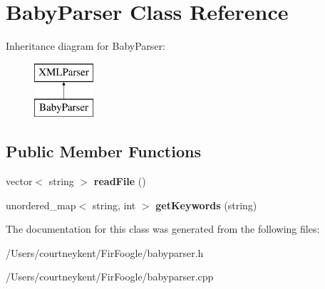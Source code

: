 \hypertarget{class_baby_parser}{\section{Baby\+Parser Class Reference}
\label{class_baby_parser}
}
Inheritance diagram for Baby\+Parser\+:\begin{figure}[H]
\begin{center}
\leavevmode
\includegraphics[height=2.000000cm]{class_baby_parser}
\end{center}
\end{figure}
\subsection*{Public Member Functions}
\begin{DoxyCompactItemize}
\item 
\hypertarget{class_baby_parser_a1d655cf5ea541ff3e5ef39652d48f245}{vector$<$ string $>$ {\bfseries read\+File} ()}\label{class_baby_parser_a1d655cf5ea541ff3e5ef39652d48f245}

\item 
\hypertarget{class_baby_parser_a67c3fa2b462cf7c727ebfa41fb70b764}{unordered\+\_\+map$<$ string, int $>$ {\bfseries get\+Keywords} (string)}\label{class_baby_parser_a67c3fa2b462cf7c727ebfa41fb70b764}

\end{DoxyCompactItemize}


The documentation for this class was generated from the following files\+:\begin{DoxyCompactItemize}
\item 
/\+Users/courtneykent/\+Fir\+Foogle/babyparser.\+h\item 
/\+Users/courtneykent/\+Fir\+Foogle/babyparser.\+cpp\end{DoxyCompactItemize}
